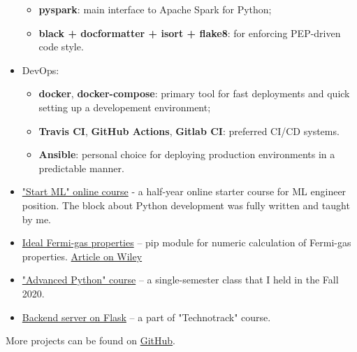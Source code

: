 \begin{itemize}
\begin{itemize}
            \item \textbf{pyspark}: main interface to Apache Spark for Python;
            \item \textbf{black + docformatter + isort + flake8}: for enforcing PEP-driven code style.
        \end{itemize}
    \item DevOps: 
        \begin{itemize}
            \item \textbf{docker}, \textbf{docker-compose}: primary tool for fast deployments and quick setting up a developement environment;
            \item \textbf{Travis CI}, \textbf{GitHub Actions}, \textbf{Gitlab CI}: preferred CI/CD systems.
            \item \textbf{Ansible}: personal choice for deploying production environments in a predictable manner.
        \end{itemize}
\end{itemize}

\begin{itemize}
    \item \href{https://karpov.courses/ml-start}{"Start ML" online course} - a half-year online starter course for ML engineer position. The block about Python development was fully written and taught by me.
    \item \href{https://github.com/alekseik1/ifg-py}{Ideal Fermi-gas properties} -- pip module for numeric calculation of Fermi-gas properties. \href{http://dx.doi.org/10.1002/ctpp.202100139}{Article on Wiley}
    \item \href{https://github.com/alekseik1/advanced_python_1sem_2020}{"Advanced Python" course} -- a single-semester class that I held in the Fall 2020.
    \item \href{https://github.com/alekseik1/tt-ridesharing-backend}{Backend server on Flask} -- a part of "Technotrack" course.
\end{itemize}
More projects can be found on \href{https://github.com/alekseik1/}{GitHub}.

